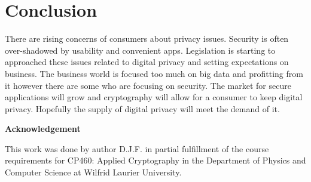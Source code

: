 \documentclass[12pt]{article}
\begin{document}
\section{Conclusion}\label{sec:conclusion}
There are rising concerns of consumers about privacy issues. Security is often over-shadowed by usability and convenient apps. Legislation is starting to approached these issues related to digital privacy and setting expectations on business. The business world is focused too much on big data and profitting from it however there are some who are focusing on security. The market for secure applications will grow and cryptography will allow for a consumer to keep digital privacy. Hopefully the supply of digital privacy will meet the demand of it.

\begin{center}
{\bf Acknowledgement}
\end{center}
This work was done by author D.J.F. in partial fulfillment of the course requirements for CP460: Applied Cryptography in the Department of Physics and Computer Science at Wilfrid Laurier University.
\end{document}
